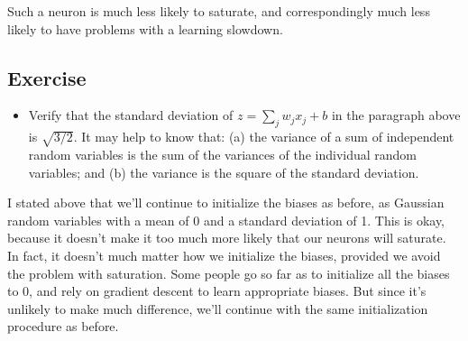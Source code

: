 \documentclass[a4paper,twoside,10pt]{book}
\begin{document}
Such a neuron is much less likely to saturate, and correspondingly much less likely to have problems with a learning slowdown.

\subsection*{Exercise}
\begin{itemize}
	\item Verify that the standard deviation of $z=\sum_jw_jx_j+b$ in the paragraph above is $\sqrt{3/2}$. It may help to know that: (a) the variance of a sum of independent random variables is the sum of the variances of the individual random variables; and (b) the variance is the square of the standard deviation.
\end{itemize}
I stated above that we'll continue to initialize the biases as before, as Gaussian random variables with a mean of 0 and a standard deviation of 1. This is okay, because it doesn't make it too much more likely that our neurons will saturate. In fact, it doesn't much matter how we initialize the biases, provided we avoid the problem with saturation. Some people go so far as to initialize all the biases to 0, and rely on gradient descent to learn appropriate biases. But since it's unlikely to make much difference, we'll continue with the same initialization procedure as before.
\end{document}
